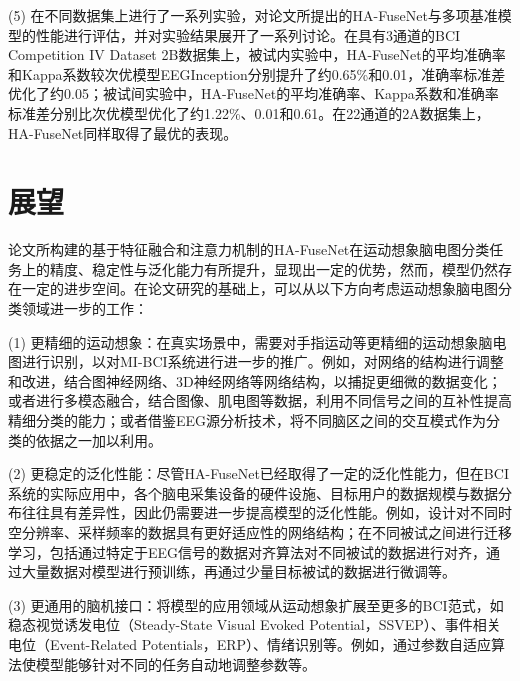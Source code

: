 (5) 在不同数据集上进行了一系列实验，对论文所提出的HA-FuseNet与多项基准模型的性能进行评估，并对实验结果展开了一系列讨论。在具有3通道的BCI Competition IV Dataset 2B数据集上，被试内实验中，HA-FuseNet的平均准确率和Kappa系数较次优模型EEGInception分别提升了约0.65\%和0.01，准确率标准差优化了约0.05；被试间实验中，HA-FuseNet的平均准确率、Kappa系数和准确率标准差分别比次优模型优化了约1.22\%、0.01和0.61。在22通道的2A数据集上，HA-FuseNet同样取得了最优的表现。

\section{展望}

论文所构建的基于特征融合和注意力机制的HA-FuseNet在运动想象脑电图分类任务上的精度、稳定性与泛化能力有所提升，显现出一定的优势，然而，模型仍然存在一定的进步空间。在论文研究的基础上，可以从以下方向考虑运动想象脑电图分类领域进一步的工作：

(1) 更精细的运动想象：在真实场景中，需要对手指运动等更精细的运动想象脑电图进行识别，以对MI-BCI系统进行进一步的推广。例如，对网络的结构进行调整和改进，结合图神经网络、3D神经网络等网络结构，以捕捉更细微的数据变化；或者进行多模态融合，结合图像、肌电图等数据，利用不同信号之间的互补性提高精细分类的能力；或者借鉴EEG源分析技术，将不同脑区之间的交互模式作为分类的依据之一加以利用。

(2) 更稳定的泛化性能：尽管HA-FuseNet已经取得了一定的泛化性能力，但在BCI系统的实际应用中，各个脑电采集设备的硬件设施、目标用户的数据规模与数据分布往往具有差异性，因此仍需要进一步提高模型的泛化性能。例如，设计对不同时空分辨率、采样频率的数据具有更好适应性的网络结构；在不同被试之间进行迁移学习，包括通过特定于EEG信号的数据对齐算法对不同被试的数据进行对齐，通过大量数据对模型进行预训练，再通过少量目标被试的数据进行微调等。

(3) 更通用的脑机接口：将模型的应用领域从运动想象扩展至更多的BCI范式，如稳态视觉诱发电位（Steady-State Visual Evoked Potential，SSVEP）、事件相关电位（Event-Related Potentials，ERP）、情绪识别等。例如，通过参数自适应算法使模型能够针对不同的任务自动地调整参数等。